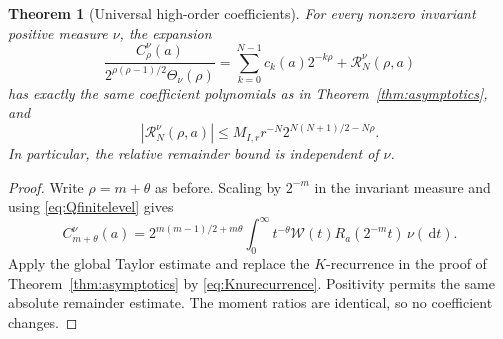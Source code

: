 \documentclass[11pt,letterpaper]{article}
\numberwithin{equation}{section}
\newtheorem{theorem}{Theorem}[section]
\theoremstyle{definition}
\theoremstyle{remark}
\newcommand{\W}{\mathcal W}
\newcommand{\dd}{\,\mathrm d}
\begin{document}
\begin{theorem}[Universal high-order coefficients]\label{thm:universal}
For every nonzero invariant positive measure $\nu$, the expansion
\begin{equation}\label{eq:universalexp}
 \frac{C_\rho^\nu(a)}{2^{\rho(\rho-1)/2}\Theta_\nu(\rho)}
 =\sum_{k=0}^{N-1}c_k(a)2^{-k\rho}+\mathcal R_N^\nu(\rho,a)
\end{equation}
has exactly the same coefficient polynomials as in
Theorem~\ref{thm:asymptotics}, and
\begin{equation}\label{eq:universalremainder}
 |\mathcal R_N^\nu(\rho,a)|
 \le M_{I,r}r^{-N}2^{N(N+1)/2-N\rho}.
\end{equation}
In particular, the relative remainder bound is independent of $\nu$.
\end{theorem}
\begin{proof}
Write $\rho=m+\theta$ as before. Scaling by $2^{-m}$ in the invariant
measure and using \eqref{eq:Qfinitelevel} gives
\[
 C_{m+\theta}^\nu(a)
 =2^{m(m-1)/2+m\theta}
   \int_0^\infty t^{-\theta}\W(t)R_a(2^{-m}t)\,\nu(\dd t).
\]
Apply the global Taylor estimate and replace the $K$-recurrence in the
proof of Theorem~\ref{thm:asymptotics} by
\eqref{eq:Knurecurrence}. Positivity permits the same absolute remainder
estimate. The moment ratios are identical, so no coefficient changes.
\end{proof}
\end{document}
